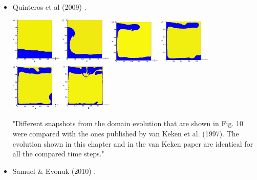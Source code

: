 \begin{itemize}
\item Quinteros et al (2009) \cite{qurj09}.

\begin{center}
\includegraphics[width=5cm]{images/benchmark_vaks97/qurj09_a}
\includegraphics[width=5cm]{images/benchmark_vaks97/qurj09_b}
\includegraphics[width=5cm]{images/benchmark_vaks97/qurj09_c}
\end{center}

"Different snapshots from the domain evolution that are shown in Fig. 10 were compared with the 
ones published by van Keken et al. (1997). The evolution shown in this chapter and 
in the van Keken paper are identical for all the compared time steps."

\item Samuel \& Evonuk (2010) \cite{saev10}.


\end{itemize}
